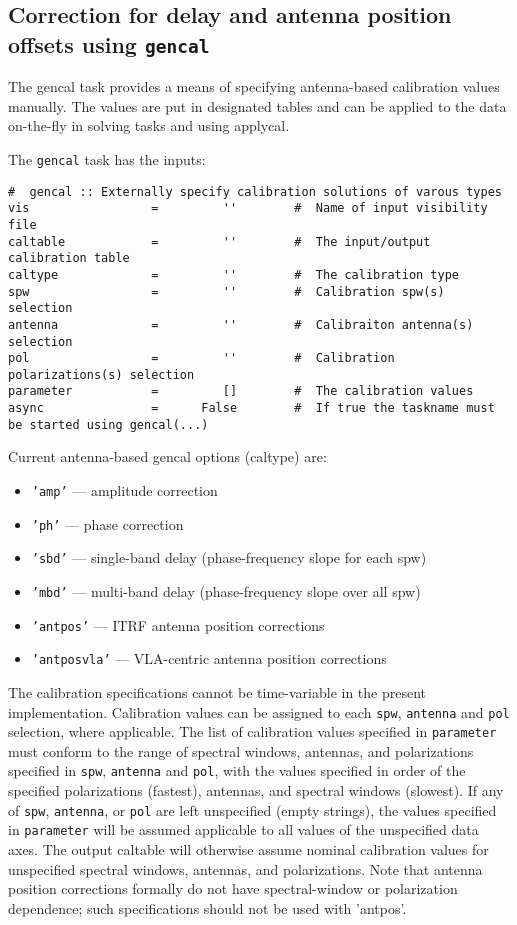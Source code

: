 \subsection{Correction for delay and antenna position offsets 
   using {\tt gencal}}
\label{section:cal.prior.gencal}


The gencal task provides a means of specifying antenna-based
calibration values manually.  The values are put in designated tables
and can be applied to the data on-the-fly in solving tasks and 
using applycal.

The {\tt gencal} task has the inputs:
\small
\begin{verbatim}
#  gencal :: Externally specify calibration solutions of varous types
vis                 =         ''        #  Name of input visibility file
caltable            =         ''        #  The input/output calibration table
caltype             =         ''        #  The calibration type
spw                 =         ''        #  Calibration spw(s) selection
antenna             =         ''        #  Calibraiton antenna(s) selection
pol                 =         ''        #  Calibration polarizations(s) selection
parameter           =         []        #  The calibration values
async               =      False        #  If true the taskname must be started using gencal(...)
\end{verbatim}
\normalsize


Current antenna-based gencal options (caltype) are:
\begin{itemize}
   \item {\tt 'amp'} --- amplitude correction
   \item {\tt 'ph'} --- phase correction
   \item {\tt 'sbd'} --- single-band delay (phase-frequency slope for each spw)
   \item {\tt 'mbd'} --- multi-band delay (phase-frequency slope over all spw)
   \item {\tt 'antpos'} --- ITRF antenna position corrections
   \item {\tt 'antposvla'} --- VLA-centric antenna position corrections 
\end{itemize}

The calibration specifications cannot be time-variable in the present
implementation.  Calibration values can be assigned to each {\tt spw},
{\tt antenna} and {\tt pol} selection, where applicable.  The list 
of calibration values specified in {\tt parameter} must conform to
the range of spectral windows, antennas, and polarizations specified
in {\tt spw}, {\tt antenna} and {\tt pol}, with the values specified
in order of the specified polarizations (fastest), antennas, and spectral
windows (slowest).  If any of {\tt spw}, 
{\tt antenna}, or {\tt pol} are left unspecified (empty strings), the
values specified in {\tt parameter} will be assumed applicable to
all values of the unspecified data axes. The output caltable will
otherwise assume nominal calibration values for unspecified spectral
windows, antennas, and polarizations.  Note that antenna position
corrections formally do not have spectral-window or polarization
dependence; such specifications should not be used with 'antpos'.

